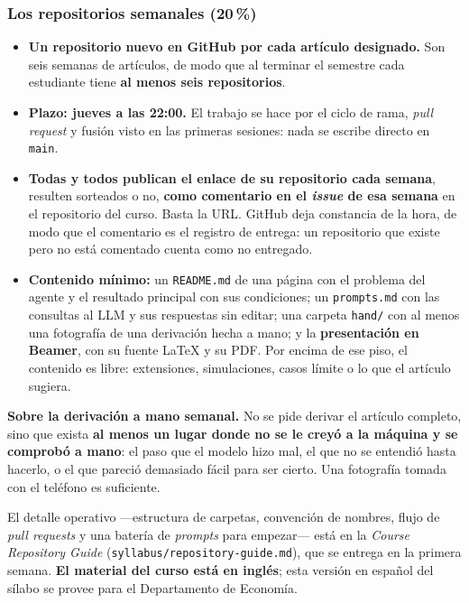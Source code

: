 \documentclass[11pt]{article}
\begin{document}
\subsubsection*{Los repositorios semanales (20\,\%)}

\begin{itemize}
\item \textbf{Un repositorio nuevo en GitHub por cada art\'iculo designado.} Son seis semanas de art\'iculos, de modo que al terminar el semestre cada estudiante tiene \textbf{al menos seis repositorios}.
\item \textbf{Plazo: jueves a las 22:00.} El trabajo se hace por el ciclo de rama, \emph{pull request} y fusi\'on visto en las primeras sesiones: nada se escribe directo en \texttt{main}.
\item \textbf{Todas y todos publican el enlace de su repositorio cada semana}, resulten sorteados o no, \textbf{como comentario en el \emph{issue} de esa semana} en el repositorio del curso. Basta la URL. GitHub deja constancia de la hora, de modo que el comentario es el registro de entrega: un repositorio que existe pero no est\'a comentado cuenta como no entregado.
\item \textbf{Contenido m\'inimo:} un \texttt{README.md} de una p\'agina con el problema del agente y el resultado principal con sus condiciones; un \texttt{prompts.md} con las consultas al LLM y sus respuestas sin editar; una carpeta \texttt{hand/} con al menos una fotograf\'ia de una derivaci\'on hecha a mano; y la \textbf{presentaci\'on en Beamer}, con su fuente \LaTeX{} y su PDF. Por encima de ese piso, el contenido es libre: extensiones, simulaciones, casos l\'imite o lo que el art\'iculo sugiera.
\end{itemize}

\textbf{Sobre la derivaci\'on a mano semanal.} No se pide derivar el art\'iculo completo, sino que exista \textbf{al menos un lugar donde no se le crey\'o a la m\'aquina y se comprob\'o a mano}: el paso que el modelo hizo mal, el que no se entendi\'o hasta hacerlo, o el que pareci\'o demasiado f\'acil para ser cierto. Una fotograf\'ia tomada con el tel\'efono es suficiente.

El detalle operativo ---estructura de carpetas, convenci\'on de nombres, flujo de \emph{pull requests} y una bater\'ia de \emph{prompts} para empezar--- est\'a en la \emph{Course Repository Guide} (\texttt{syllabus/\allowbreak repository-guide.md}), que se entrega en la primera semana. \textbf{El material del curso est\'a en ingl\'es}; esta versi\'on en espa\~nol del s\'ilabo se provee para el Departamento de Econom\'ia.
\end{document}

